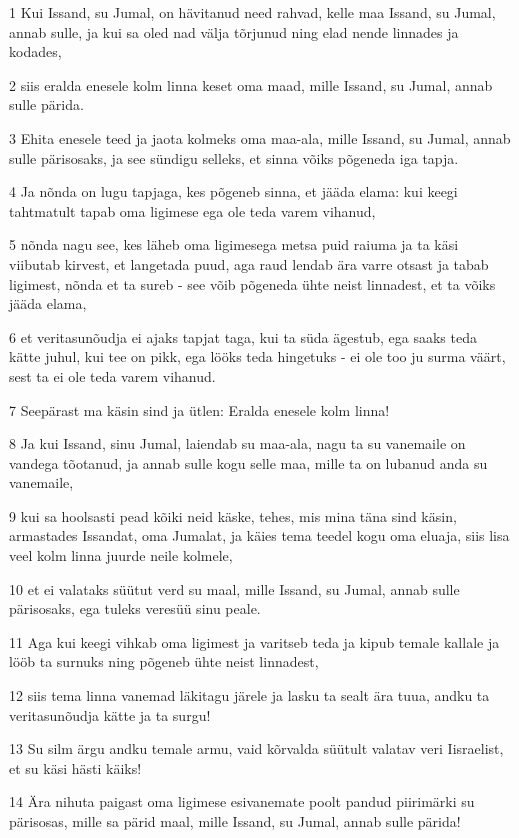 \par 1 Kui Issand, su Jumal, on hävitanud need rahvad, kelle maa Issand, su Jumal, annab sulle, ja kui sa oled nad välja tõrjunud ning elad nende linnades ja kodades,
\par 2 siis eralda enesele kolm linna keset oma maad, mille Issand, su Jumal, annab sulle pärida.
\par 3 Ehita enesele teed ja jaota kolmeks oma maa-ala, mille Issand, su Jumal, annab sulle pärisosaks, ja see sündigu selleks, et sinna võiks põgeneda iga tapja.
\par 4 Ja nõnda on lugu tapjaga, kes põgeneb sinna, et jääda elama: kui keegi tahtmatult tapab oma ligimese ega ole teda varem vihanud,
\par 5 nõnda nagu see, kes läheb oma ligimesega metsa puid raiuma ja ta käsi viibutab kirvest, et langetada puud, aga raud lendab ära varre otsast ja tabab ligimest, nõnda et ta sureb - see võib põgeneda ühte neist linnadest, et ta võiks jääda elama,
\par 6 et veritasunõudja ei ajaks tapjat taga, kui ta süda ägestub, ega saaks teda kätte juhul, kui tee on pikk, ega lööks teda hingetuks - ei ole too ju surma väärt, sest ta ei ole teda varem vihanud.
\par 7 Seepärast ma käsin sind ja ütlen: Eralda enesele kolm linna!
\par 8 Ja kui Issand, sinu Jumal, laiendab su maa-ala, nagu ta su vanemaile on vandega tõotanud, ja annab sulle kogu selle maa, mille ta on lubanud anda su vanemaile,
\par 9 kui sa hoolsasti pead kõiki neid käske, tehes, mis mina täna sind käsin, armastades Issandat, oma Jumalat, ja käies tema teedel kogu oma eluaja, siis lisa veel kolm linna juurde neile kolmele,
\par 10 et ei valataks süütut verd su maal, mille Issand, su Jumal, annab sulle pärisosaks, ega tuleks veresüü sinu peale.
\par 11 Aga kui keegi vihkab oma ligimest ja varitseb teda ja kipub temale kallale ja lööb ta surnuks ning põgeneb ühte neist linnadest,
\par 12 siis tema linna vanemad läkitagu järele ja lasku ta sealt ära tuua, andku ta veritasunõudja kätte ja ta surgu!
\par 13 Su silm ärgu andku temale armu, vaid kõrvalda süütult valatav veri Iisraelist, et su käsi hästi käiks!
\par 14 Ära nihuta paigast oma ligimese esivanemate poolt pandud piirimärki su pärisosas, mille sa pärid maal, mille Issand, su Jumal, annab sulle pärida!
